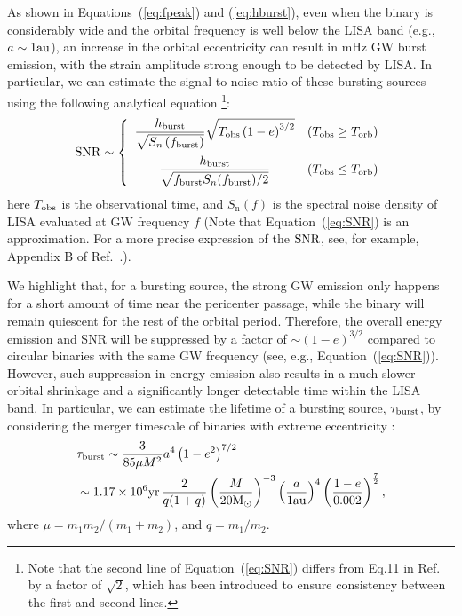 \documentclass[%
 reprint,
 amsmath,amssymb,
 aps,
]{revtex4-2}
\begin{document}
As shown in Equations~(\ref{eq:fpeak}) and (\ref{eq:hburst}), even when the binary is considerably wide and the orbital frequency is well below the LISA band (e.g., $a \sim 1 \rm au$), an increase in the orbital eccentricity can result in mHz GW burst emission, with the strain amplitude strong enough to be detected by LISA. In particular, we can estimate the signal-to-noise ratio of these bursting sources using the following analytical equation \citep{Xuan+23b}\footnote{Note that the second line of Equation~(\ref{eq:SNR}) differs from Eq.11 in Ref.~\citep{Xuan+23b} by a factor of $\sqrt{2}$, which has been introduced to ensure consistency between the first and second lines. }:
\begin{align}
{\rm SNR} \sim
\left\{
\begin{array}{cc}
     \dfrac{h_{\rm burst}}{\sqrt{S_n\left(f_{\rm burst }\right)}} \sqrt{T_{\rm o b s}\left(1-e\right)^{3 / 2}} & (T_{\rm obs} \geq T_{\rm orb})\\[3ex]
     \dfrac{h_{\rm burst}}{\sqrt{f_{\rm burst} S_n(f_{\rm burst })/2}} & (T_{\rm obs} \leq T_{\rm orb})
\end{array}
\right.
\label{eq:SNR}
\end{align}
here $T_{\rm obs}$ is the observational time, and $S_{\mathrm{n}}(f)$ is the
spectral noise density of LISA evaluated at GW frequency $f$
\citep[see e.g.,][]{thorne_1987,Klein+16,2016PhRvD..93b4003K,Robson+19LISAnoise,} (Note that Equation~(\ref{eq:SNR}) is an approximation. For a more precise expression of the $\rm SNR$, see, for example, Appendix B of Ref.~\citep{Xuan+23b}.).

We highlight that, for a bursting source, the strong GW emission only happens for a short amount of time near the pericenter passage, while the binary will remain quiescent for the rest of the orbital period. Therefore, the overall energy emission and 
SNR will be suppressed by a factor of $\sim (1-e)^{3/2}$ compared to circular binaries with the same GW frequency (see, e.g., Equation~(\ref{eq:SNR})). However, such suppression in energy emission also results in a much slower orbital shrinkage and a significantly longer detectable time within the LISA band. In particular, we can estimate the lifetime of a bursting source, $\tau_{\rm burst}$, by considering the merger timescale of binaries with extreme eccentricity \citep{Peters64,Xuan+23b}:  
\begin{align}
    &\tau_{\mathrm{burst}}\sim \frac{3}{85\mu M^2} a^4\left(1-e^2\right)^{7 / 2}\nonumber\\
    &\sim  1.17\times10^{6}{\rm yr} \,\frac{2}{q(1+q)}\left(\frac{M}{20\rm M_{\odot}}\right)^{-3} \left(\frac{a}{1\rm au}\right)^{4}\left(\frac{1-e}{0.002}\right)^{\frac{7}{2}} ,
    \label{eq:lifetime}
\end{align}
where $\mu=m_{1}m_{2}/(m_1+m_2)$, and $q=m_1/m_2$. 
\end{document}
